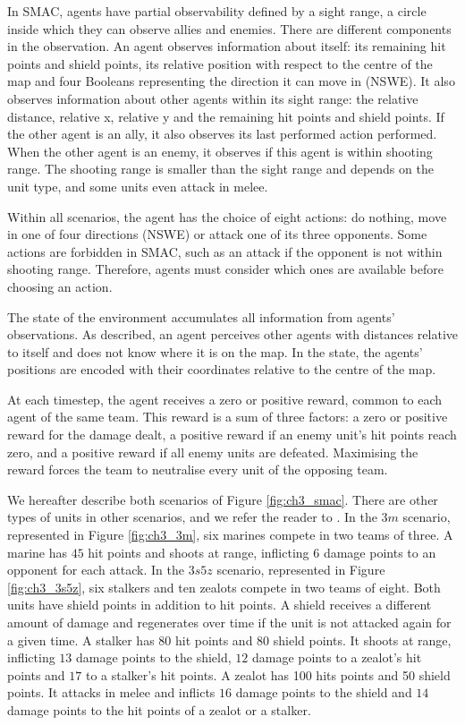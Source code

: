 In SMAC, agents have partial observability defined by a sight range, a circle inside which they can observe allies and enemies.
There are different components in the observation.
An agent observes information about itself: its remaining hit points and shield points, its relative position with respect to the centre of the map and four Booleans representing the direction it can move in (NSWE). 
It also observes information about other agents within its sight range: the relative distance, relative x, relative y and the remaining hit points and shield points. 
If the other agent is an ally, it also observes its last performed action performed.
When the other agent is an enemy, it observes if this agent is within shooting range.
The shooting range is smaller than the sight range and depends on the unit type, and some units even attack in melee.

Within all scenarios, the agent has the choice of eight actions: do nothing, move in one of four directions (NSWE) or attack one of its three opponents.
Some actions are forbidden in SMAC, such as an attack if the opponent is not within shooting range.
Therefore, agents must consider which ones are available before choosing an action.

The state of the environment accumulates all information from agents' observations.
As described, an agent perceives other agents with distances relative to itself and does not know where it is on the map.
In the state, the agents' positions are encoded with their coordinates relative to the centre of the map.

At each timestep, the agent receives a zero or positive reward, common to each agent of the same team. 
This reward is a sum of three factors: a zero or positive reward for the damage dealt, a positive reward if an enemy unit's hit points reach zero, and a positive reward if all enemy units are defeated. 
Maximising the reward forces the team to neutralise every unit of the opposing team.

We hereafter describe both scenarios of Figure \ref{fig:ch3_smac}.
There are other types of units in other scenarios, and we refer the reader to \citep{samvelyan2019starcraft}.
In the $3m$ scenario, represented in Figure \ref{fig:ch3_3m}, six marines compete in two teams of three.
A marine has $45$ hit points and shoots at range, inflicting $6$ damage points to an opponent for each attack.
In the $3s5z$ scenario, represented in Figure \ref{fig:ch3_3s5z}, six stalkers and ten zealots compete in two teams of eight.
Both units have shield points in addition to hit points.
A shield receives a different amount of damage and regenerates over time if the unit is not attacked again for a given time.
A stalker has $80$ hit points and $80$ shield points.
It shoots at range, inflicting $13$ damage points to the shield, $12$ damage points to a zealot's hit points and $17$ to a stalker's hit points.
A zealot has 100 hits points and 50 shield points.
It attacks in melee and inflicts $16$ damage points to the shield and $14$ damage points to the hit points of a zealot or a stalker.

